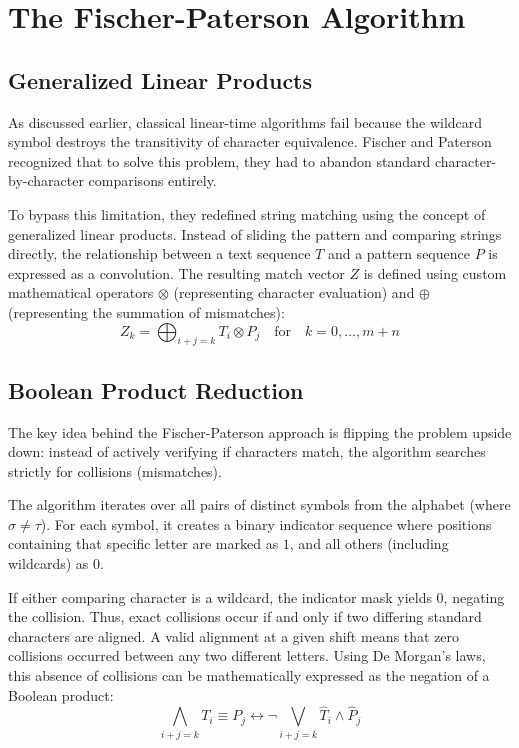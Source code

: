 \chapter{The Fischer-Paterson Algorithm}

\section{Generalized Linear Products}
As discussed earlier, classical linear-time algorithms fail because the wildcard symbol destroys the transitivity of character equivalence. Fischer and Paterson \cite{fp1974} recognized that to solve this problem, they had to abandon standard character-by-character comparisons entirely. 

To bypass this limitation, they redefined string matching using the concept of generalized linear products. Instead of sliding the pattern and comparing strings directly, the relationship between a text sequence $T$ and a pattern sequence $P$ is expressed as a convolution. The resulting match vector $Z$ is defined using custom mathematical operators $\otimes$ (representing character evaluation) and $\oplus$ (representing the summation of mismatches):
\begin{equation}
    Z_k = \bigoplus_{i+j=k} T_i \otimes P_j \quad \text{for} \quad k=0, \dots, m+n
\end{equation}

\section{Boolean Product Reduction}
The key idea behind the Fischer-Paterson approach is flipping the problem upside down: instead of actively verifying if characters match, the algorithm searches strictly for collisions (mismatches). 

The algorithm iterates over all pairs of distinct symbols from the alphabet (where $\sigma \neq \tau$). For each symbol, it creates a binary indicator sequence where positions containing that specific letter are marked as $1$, and all others (including wildcards) as $0$. 

If either comparing character is a wildcard, the indicator mask yields 0, negating the collision. Thus, exact collisions occur if and only if two differing standard characters are aligned. A valid alignment at a given shift means that zero collisions occurred between any two different letters. Using De Morgan's laws, this absence of collisions can be mathematically expressed as the negation of a Boolean product:
\begin{equation}
    \bigwedge_{i+j=k} T_i \equiv P_j \leftrightarrow \neg \bigvee_{i+j=k} \hat{T}_i \land \hat{P}_j
\end{equation}

